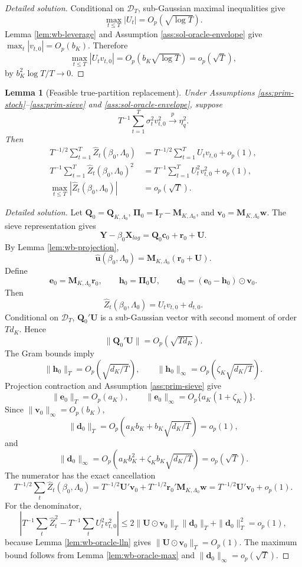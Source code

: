 \documentclass[12pt]{article}
\numberwithin{equation}{section}
\newtheorem{lemma}{Lemma}
\theoremstyle{definition}
\newcommand{\D}{\mathcal D}
\begin{document}
\begin{proof}[Detailed solution]
Conditional on \(\D_T\), sub-Gaussian maximal inequalities give
\[
    \max_{t\leq T}|U_t|=O_p(\sqrt{\log T}).
\]
Lemma \ref{lem:wb-leverage} and Assumption \ref{ass:sol-oracle-envelope} give
\(\max_t|v_{t,0}|=O_p(b_K)\).  Therefore
\[
    \max_{t\leq T}|U_tv_{t,0}|=O_p(b_K\sqrt{\log T})=o_p(\sqrt T),
\]
by \(b_K^2\log T/T\to0\).
\end{proof}

\begin{lemma}[Feasible true-partition replacement]
\label{lem:wb-feasible-replacement}
Under Assumptions \ref{ass:prim-stoch}--\ref{ass:prim-sieve} and
\ref{ass:sol-oracle-envelope}, suppose
\[
    T^{-1}\sum_{t=1}^T \sigma_t^2v_{t,0}^2\xrightarrow{p}\eta_q^2.
\]
Then
\begin{align}
    T^{-1/2}\sum_{t=1}^T\widehat Z_t(\beta_0,\Lambda_0)
    &=
    T^{-1/2}\sum_{t=1}^TU_tv_{t,0}+o_p(1),
    \\
    T^{-1}\sum_{t=1}^T\widehat Z_t(\beta_0,\Lambda_0)^2
    &=
    T^{-1}\sum_{t=1}^TU_t^2v_{t,0}^2+o_p(1),
    \\
    \max_{t\leq T}|\widehat Z_t(\beta_0,\Lambda_0)|
    &=o_p(\sqrt T).
\end{align}
\end{lemma}

\begin{proof}[Detailed solution]
Let \(\bm Q_0=\bm Q_{K,\Lambda_0}\),
\(\bm\Pi_0=\bm I_T-\bm M_{K,\Lambda_0}\), and
\(\bm v_0=\bm M_{K,\Lambda_0}\bm w\).  The sieve representation gives
\[
    \bm Y-\beta_0\bm X_{lag}
    =\bm Q_0\bm c_0+\bm r_0+\bm U.
\]
By Lemma \ref{lem:wb-projection},
\[
    \widehat{\bm u}(\beta_0,\Lambda_0)
    =\bm M_{K,\Lambda_0}(\bm r_0+\bm U).
\]
Define
\[
    \bm e_0=\bm M_{K,\Lambda_0}\bm r_0,
    \qquad
    \bm h_0=\bm\Pi_0\bm U,
    \qquad
    \bm d_0=(\bm e_0-\bm h_0)\odot\bm v_0 .
\]
Then
\[
    \widehat Z_t(\beta_0,\Lambda_0)=U_tv_{t,0}+d_{t,0}.
\]
Conditional on \(\D_T\), \(\bm Q_0'\bm U\) is a sub-Gaussian vector with
second moment of order \(Td_K\).  Hence
\[
    \|\bm Q_0'\bm U\|=O_p(\sqrt{Td_K}).
\]
The Gram bounds imply
\[
    \|\bm h_0\|_T=O_p(\sqrt{d_K/T}),
    \qquad
    \|\bm h_0\|_\infty=O_p\left(\zeta_K\sqrt{d_K/T}\right).
\]
Projection contraction and Assumption \ref{ass:prim-sieve} give
\[
    \|\bm e_0\|_T=O_p(a_K),
    \qquad
    \|\bm e_0\|_\infty=O_p\{a_K(1+\zeta_K)\}.
\]
Since \(\|\bm v_0\|_\infty=O_p(b_K)\),
\[
    \|\bm d_0\|_T
    =O_p\left(a_Kb_K+b_K\sqrt{d_K/T}\right)=o_p(1),
\]
and
\[
    \|\bm d_0\|_\infty
    =O_p\left(a_Kb_K^2+\zeta_Kb_K\sqrt{d_K/T}\right)=o_p(\sqrt T).
\]
The numerator has the exact cancellation
\[
    T^{-1/2}\sum_t\widehat Z_t(\beta_0,\Lambda_0)
    =T^{-1/2}\bm U'\bm v_0
      +T^{-1/2}\bm r_0'\bm M_{K,\Lambda_0}\bm w
    =T^{-1/2}\bm U'\bm v_0+o_p(1).
\]
For the denominator,
\[
    \left|
      T^{-1}\sum_t\widehat Z_t^2
      -T^{-1}\sum_tU_t^2v_{t,0}^2
    \right|
    \leq
      2\|\bm U\odot\bm v_0\|_T\|\bm d_0\|_T
      +\|\bm d_0\|_T^2=o_p(1),
\]
because Lemma \ref{lem:wb-oracle-lln} gives
\(\|\bm U\odot\bm v_0\|_T=O_p(1)\).  The maximum bound follows from Lemma
\ref{lem:wb-oracle-max} and \(\|\bm d_0\|_\infty=o_p(\sqrt T)\).
\end{proof}
\end{document}
